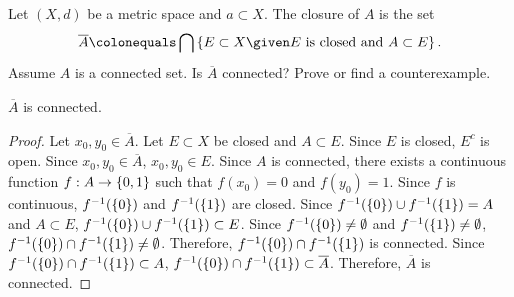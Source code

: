 \begin{problem}
  Let $(X, d)$ be a metric space and $a \subset X$.
  The closure of $A$ is the set
  \[
    \overline{A} \colonequals \bigcap \set{
      E \subset X \given \text{$E$ is closed and $A \subset E$}
    }.
  \]
  Assume $A$ is a connected set.
  Is $\overline{A}$ connected?
  Prove or find a counterexample.
\end{problem}

\begin{answer}
  $\overline{A}$ is connected.
  \begin{proof}
    Let $x_0, y_0 \in \overline{A}$.
    Let $E \subset X$ be closed and $A \subset E$.
    Since $E$ is closed, $E^c$ is open.
    Since $x_0, y_0 \in \overline{A}$, $x_0, y_0 \in E$.
    Since $A$ is connected, there exists a continuous function
    $f : A \to \left\{0, 1\right\}$ such that $f(x_0) = 0$ and $f(y_0) = 1$.
    Since $f$ is continuous, $f^{-1}(\left\{0\right\})$ and $f^{-1}(\left\{1\right\})$ are closed.
    Since $f^{-1}(\left\{0\right\}) \cup f^{-1}(\left\{1\right\}) = A$ and $A \subset E$,
    $f^{-1}(\left\{0\right\}) \cup f^{-1}(\left\{1\right\}) \subset E$.
    Since $f^{-1}(\left\{0\right\}) \neq \emptyset$ and $f^{-1}(\left\{1\right\}) \neq \emptyset$,
    $f^{-1}(\left\{0\right\}) \cap f^{-1}(\left\{1\right\}) \neq \emptyset$.
    Therefore, $f^{-1}(\left\{0\right\}) \cap f^{-1}(\left\{1\right\})$ is connected.
    Since $f^{-1}(\left\{0\right\}) \cap f^{-1}(\left\{1\right\}) \subset A$,
    $f^{-1}(\left\{0\right\}) \cap f^{-1}(\left\{1\right\}) \subset \overline{A}$.
    Therefore, $\overline{A}$ is connected.
  \end{proof}
\end{answer}

